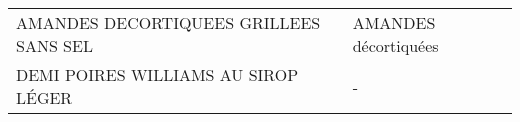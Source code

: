 \begin{longtable}{p{5cm}p{10cm}}
                                                                   AMANDES DECORTIQUEES GRILLEES SANS SEL &                                                                                                                                                                                                                                                                                                                                                                                                                                                                                                                                                                                                                                                                                                                                                                                                                                                                                                                                                                                                                     AMANDES décortiquées \\
                                                                      DEMI POIRES WILLIAMS AU SIROP LÉGER &                                                                                                                                                                                                                                                                                                                                                                                                                                                                                                                                                                                                                                                                                                                                                                                                                                                                                                                                                                                                                                        - \\

\end{longtable}
